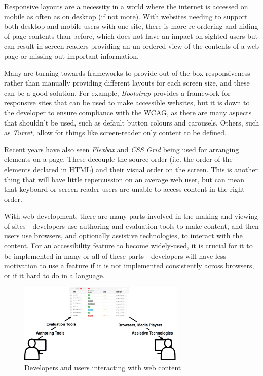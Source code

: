 \documentclass[ %
                    author={Aleena Baig},
                supervisor={Dr Simon Lock},
                    degree={BSc},
                     title={On Making Web Accessible Graphs},
                  subtitle={},
                      year={2019} ]{dissertation}
\begin{document}
Responsive layouts are a necessity in a world where the internet is accessed on mobile as often as on desktop (if not more).\cite{mobileusestudy} With websites needing to support both desktop and mobile users with one site, there is more re-ordering and hiding of page contents than before, which does not have an impact on sighted users but can result in screen-readers providing an un-ordered view of the contents of a web page or missing out important information.

Many are turning towards frameworks to provide out-of-the-box responsiveness rather than manually providing different layouts for each screen size, and these can be a good solution. For example, \textit{Bootstrap} provides a framework for responsive sites that can be used to make accessible websites, but it is down to the developer to ensure compliance with the WCAG, as there are many aspects that shouldn't be used, such as default button colours and carousels.\cite{bootstrapaccessibility} Others, such as \textit{Turret}, allow for things like screen-reader only content to be defined.\cite{turretaccessibility}

Recent years have also seen \textit{Flexbox} and \textit{CSS Grid} being used for arranging elements on a page. These decouple the source order (i.e. the order of the elements declared in HTML) and their visual order on the screen. This is another thing that will have little repercussion on an average web user, but can mean that keyboard or screen-reader users are unable to access content in the right order.


With web development, there are many parts involved in the making and viewing of sites - developers use authoring and evaluation tools to make content, and then users use browsers, and optionally assistive technologies, to interact with the content. For an accessibility feature to become widely-used, it is crucial for it to be implemented in many or all of these parts - developers will have less motivation to use a feature if it is not implemented consistently across browsers, or if it hard to do in a language.

\begin{figure}[h]
\includegraphics[width=8cm]{images/W3Components.png}
\centering
\caption{Developers and users interacting with web content}
\end{figure}
\end{document}

